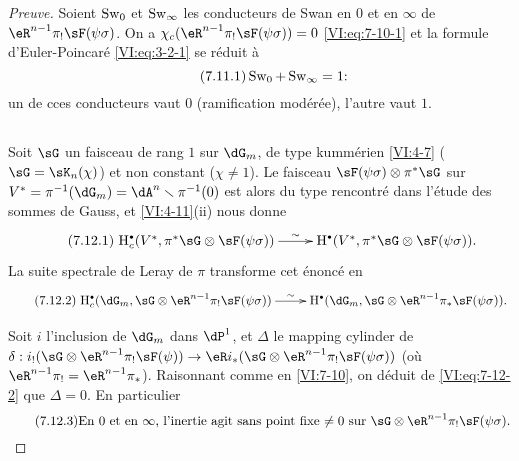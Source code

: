 \begin{proof}[Preuve]
Soient $\operatorname{Sw}_0$ et $\operatorname{Sw}_\infty$ les conducteurs de Swan en $0$ et en 
$\infty$ de $\eR^{n-1} \pi_! \sF(\psi\sigma)$. On a 
$\chi_c(\eR^{n-1} \pi_! \sF(\psi\sigma))=0$ \eqref{VI:eq:7-10-1} et la formule 
d'Euler-Poincar\'e \eqref{VI:eq:3-2-1} se r\'eduit \`a 
\begin{equation*}\tag{7.11.1}\label{VI:eq:7-11-1}
  \operatorname{Sw}_0 + \operatorname{Sw}_\infty =1 \text{:} 
\end{equation*}
un de cces conducteurs vaut $0$ (ramification mod\'er\'ee), l'autre vaut $1$. 





\subsection{}\label{VI:7-12}

Soit $\sG$ un faisceau de rang $1$ sur $\dG_m$, de type kumm\'erien 
\ref{VI:4-7} ($\sG=\sK_n(\chi)$) et non constant ($\chi\ne 1$). Le faisceau 
$\sF(\psi\sigma)\otimes \pi^\ast \sG$ sur 
$V^\ast=\pi^{-1}(\dG_m) = \dA^n\setminus \pi^{-1}(0)$ est alors du type 
rencontr\'e dans l'\'etude des sommes de Gauss, et \ref{VI:4-11}(ii) nous donne 
\begin{equation*}\tag{7.12.1}\label{VI:eq:7-12-1}
\xymatrix{
  \h_c^\bullet(V^\ast,\pi^\ast\sG\otimes \sF(\psi\sigma)) \ar[r]^-\sim 
    & \h^\bullet(V^\ast,\pi^\ast \sG\otimes \sF(\psi\sigma)) \text{.} 
}
\end{equation*}
La suite spectrale de Leray de $\pi$ transforme cet \'enonc\'e en 
\begin{equation*}\tag{7.12.2}\label{VI:eq:7-12-2}
\xymatrix{
  \h_c^\bullet(\dG_m,\sG\otimes \eR^{n-1} \pi_! \sF(\psi\sigma)) \ar[r]^-\sim 
    & \h^\bullet(\dG_m,\sG\otimes \eR^{n-1} \pi_\ast \sF(\psi\sigma)) \text{.} 
}
\end{equation*}

Soit $i$ l'inclusion de $\dG_m$ dans $\dP^1$, et $\Delta$ le mapping cylinder 
de 
$\delta:i_!(\sG\otimes \eR^{n-1}\pi_! \sF(\psi))\to \eR i_\ast (\sG\otimes \eR^{n-1} \pi_! \sF(\psi\sigma))$
(o\`u $\eR^{n-1} \pi_! = \eR^{n-1}\pi_\ast$). Raisonnant comme en 
\ref{VI:7-10}, on d\'eduit de \eqref{VI:eq:7-12-2} que $\Delta=0$. En 
particulier 
\begin{equation*}\tag{7.12.3}\label{VI:eq:7-12-3}
  \text{En $0$ et en $\infty$, l'inertie agit sans point fixe $\ne 0$ sur $\sG\otimes \eR^{n-1}\pi_! \sF(\psi\sigma)$.}
\end{equation*}


\end{proof}
